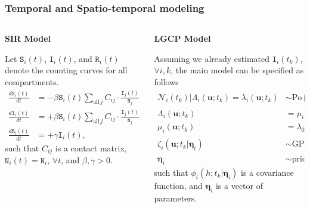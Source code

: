 \documentclass[12pt, aspectratio = 169]{beamer} %
\begin{document}
	\begin{frame}[t]
		\frametitle{Temporal and Spatio-temporal modeling}
		\justifying
		
		\begin{columns}[T] %
			\begin{column}{.48\textwidth}
				{\hfill{\large\textbf{SIR Model}}\hfill}\vspace{12pt}
				
				\justifying
				Let $\texttt{S}_i(t)$, $\texttt{I}_i(t)$, and $\texttt{R}_i(t)$ denote the counting curves for all compartments.
				{\footnotesize
				\begin{align*} 
					\frac{d\texttt{S}_i(t)}{dt} &= -\beta \texttt{S}_i(t) \sum_{\text{all}\,j}C_{ij}\cdot\frac{\texttt{I}_j(t)}{\texttt{N}_j} \\
					\frac{d\texttt{I}_i(t)}{dt} &= +\beta \texttt{S}_i(t) \sum_{\text{all}\,j}C_{ij}\cdot\frac{\texttt{I}_j(t)}{\texttt{N}_j} - \gamma \texttt{I}_i(t) \nonumber \\
					\frac{d\texttt{R}_i(t)}{dt} &= +\gamma \texttt{I}_i(t), \nonumber
				\end{align*}
				}%
				such that $C_{ij}$ is a contact matrix, $\texttt{N}_i(t) = \texttt{N}_i$, $\forall t$, and $\beta, \gamma > 0$.
			\end{column}%
			\hfill%
			\vline
			\hfill%
			\begin{column}{.60\textwidth}
				{\hfill{\large\textbf{LGCP Model}}\hfill}\vspace{12pt}
				
				\justifying
				Assuming we already estimated  $\texttt{I}_i(t_k)$, $\forall i, k$, the main model can be specified as follows
				{\footnotesize
				\begin{align*}
					\mathcal{N}_i(t_k)|\Lambda_i(\mathbf{u}; t_k) = \lambda_i(\mathbf{u}; t_k) &\sim \text{Po}\left(\int_{\mathcal{U}}\lambda_i(\mathbf{u}; t_k)d\mathbf{u}\right) \\
					\Lambda_i(\mathbf{u}; t_k) &= \mu_i(\mathbf{u}; t_k) \cdot \exp\{\zeta_i({\mathbf{u}; t_k})\} \nonumber \\
					\mu_i(\mathbf{u}; t_k) &= \lambda_{0, i}(\mathbf{u}; t_k) \cdot \texttt{I}_i(t_k) \nonumber \\ 
					\zeta_i(\mathbf{u}; t_k | \boldsymbol{\eta}_i) &\sim \text{GP} (\beta_{0, i}, \phi_i(h; t_k | \boldsymbol{\eta}_i)) \nonumber \\
					\boldsymbol{\eta}_i &\sim \text{priors}, \nonumber
				\end{align*}
				}%
				such that $\phi_i(h; t_k | \boldsymbol{\eta}_i)$ is a covariance function, and $\boldsymbol{\eta}_i$ is a vector of parameters.
			\end{column}%
		\end{columns}
		
	
		
	\end{frame}
		
\end{document}
